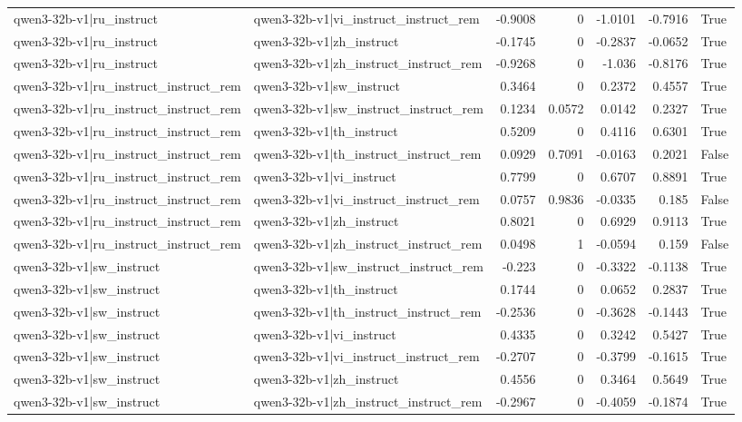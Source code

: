 \begin{table}
\begin{tabular}{l l r r r r l}
qwen3-32b-v1|ru_instruct & qwen3-32b-v1|vi_instruct_instruct_rem & -0.9008 & 0 & -1.0101 & -0.7916 & True \\
qwen3-32b-v1|ru_instruct & qwen3-32b-v1|zh_instruct & -0.1745 & 0 & -0.2837 & -0.0652 & True \\
qwen3-32b-v1|ru_instruct & qwen3-32b-v1|zh_instruct_instruct_rem & -0.9268 & 0 & -1.036 & -0.8176 & True \\
qwen3-32b-v1|ru_instruct_instruct_rem & qwen3-32b-v1|sw_instruct & 0.3464 & 0 & 0.2372 & 0.4557 & True \\
qwen3-32b-v1|ru_instruct_instruct_rem & qwen3-32b-v1|sw_instruct_instruct_rem & 0.1234 & 0.0572 & 0.0142 & 0.2327 & True \\
qwen3-32b-v1|ru_instruct_instruct_rem & qwen3-32b-v1|th_instruct & 0.5209 & 0 & 0.4116 & 0.6301 & True \\
qwen3-32b-v1|ru_instruct_instruct_rem & qwen3-32b-v1|th_instruct_instruct_rem & 0.0929 & 0.7091 & -0.0163 & 0.2021 & False \\
qwen3-32b-v1|ru_instruct_instruct_rem & qwen3-32b-v1|vi_instruct & 0.7799 & 0 & 0.6707 & 0.8891 & True \\
qwen3-32b-v1|ru_instruct_instruct_rem & qwen3-32b-v1|vi_instruct_instruct_rem & 0.0757 & 0.9836 & -0.0335 & 0.185 & False \\
qwen3-32b-v1|ru_instruct_instruct_rem & qwen3-32b-v1|zh_instruct & 0.8021 & 0 & 0.6929 & 0.9113 & True \\
qwen3-32b-v1|ru_instruct_instruct_rem & qwen3-32b-v1|zh_instruct_instruct_rem & 0.0498 & 1 & -0.0594 & 0.159 & False \\
qwen3-32b-v1|sw_instruct & qwen3-32b-v1|sw_instruct_instruct_rem & -0.223 & 0 & -0.3322 & -0.1138 & True \\
qwen3-32b-v1|sw_instruct & qwen3-32b-v1|th_instruct & 0.1744 & 0 & 0.0652 & 0.2837 & True \\
qwen3-32b-v1|sw_instruct & qwen3-32b-v1|th_instruct_instruct_rem & -0.2536 & 0 & -0.3628 & -0.1443 & True \\
qwen3-32b-v1|sw_instruct & qwen3-32b-v1|vi_instruct & 0.4335 & 0 & 0.3242 & 0.5427 & True \\
qwen3-32b-v1|sw_instruct & qwen3-32b-v1|vi_instruct_instruct_rem & -0.2707 & 0 & -0.3799 & -0.1615 & True \\
qwen3-32b-v1|sw_instruct & qwen3-32b-v1|zh_instruct & 0.4556 & 0 & 0.3464 & 0.5649 & True \\
qwen3-32b-v1|sw_instruct & qwen3-32b-v1|zh_instruct_instruct_rem & -0.2967 & 0 & -0.4059 & -0.1874 & True \\

\end{tabular}
\end{table}
